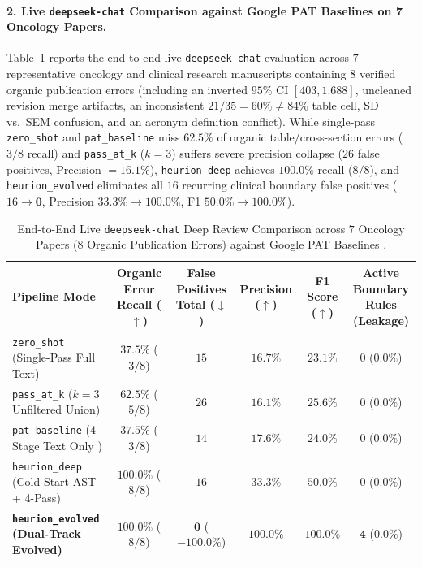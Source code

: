 \documentclass[11pt,a4paper]{article}
\makeatletter
\newcommand{\thead}[1]{\begin{tabular}[c]{@{}c@{}}#1\end{tabular}}
\makeatother
\begin{document}
\paragraph{2. Live \texttt{deepseek-chat} Comparison against Google PAT Baselines on 7 Oncology Papers.}
Table~\ref{tab:deep_review_7papers} reports the end-to-end live \texttt{deepseek-chat} evaluation across $7$ representative oncology and clinical research manuscripts containing $8$ verified organic publication errors (including an inverted $95\%$ CI $[403, 1.688]$, uncleaned revision merge artifacts, an inconsistent $21/35 = 60\% \neq 84\%$ table cell, SD vs.\ SEM confusion, and an acronym definition conflict). While single-pass \texttt{zero\_shot} and \texttt{pat\_baseline} \cite{googlepat2026} miss $62.5\%$ of organic table/cross-section errors ($3/8$ recall) and \texttt{pass\_at\_k} ($k=3$) suffers severe precision collapse ($26$ false positives, Precision $= 16.1\%$), \texttt{heurion\_deep} achieves $\mathbf{100.0\%}$ recall ($8/8$), and \texttt{heurion\_evolved} eliminates all $16$ recurring clinical boundary false positives ($16 \to \mathbf{0}$, Precision $33.3\% \to \mathbf{100.0\%}$, F1 $50.0\% \to \mathbf{100.0\%}$).

\begin{table}[!t]
\centering
\caption{End-to-End Live \texttt{deepseek-chat} Deep Review Comparison across $7$ Oncology Papers ($8$ Organic Publication Errors) against Google PAT Baselines \cite{googlepat2026}.}
\label{tab:deep_review_7papers}
\vspace{2pt}
\small
\setlength{\tabcolsep}{0pt}
\begin{tabular*}{\textwidth}{@{\extracolsep{\fill}}lccccc@{}}
\toprule
\textbf{Pipeline Mode} & \thead{\textbf{Organic Error}\\\textbf{Recall ($\uparrow$)}} & \thead{\textbf{False Positives}\\\textbf{Total ($\downarrow$)}} & \thead{\textbf{Precision}\\\textbf{($\uparrow$)}} & \thead{\textbf{F1 Score}\\\textbf{($\uparrow$)}} & \thead{\textbf{Active Boundary}\\\textbf{Rules (Leakage)}} \\
\midrule
\texttt{zero\_shot} (Single-Pass Full Text) & $37.5\%$ ($3/8$) & $15$ & $16.7\%$ & $23.1\%$ & $0$ ($0.0\%$) \\
\texttt{pass\_at\_k} ($k=3$ Unfiltered Union) & $62.5\%$ ($5/8$) & $26$ & $16.1\%$ & $25.6\%$ & $0$ ($0.0\%$) \\
\texttt{pat\_baseline} (4-Stage Text Only \cite{googlepat2026}) & $37.5\%$ ($3/8$) & $14$ & $17.6\%$ & $24.0\%$ & $0$ ($0.0\%$) \\
\texttt{heurion\_deep} (Cold-Start AST + 4-Pass) & $\mathbf{100.0\%}$ ($8/8$) & $16$ & $33.3\%$ & $50.0\%$ & $0$ ($0.0\%$) \\
\textbf{\texttt{heurion\_evolved} (Dual-Track Evolved)} & $\mathbf{100.0\%}$ ($8/8$) & $\mathbf{0}$ ($\mathbf{-100.0\%}$) & $\mathbf{100.0\%}$ & $\mathbf{100.0\%}$ & $\mathbf{4}$ ($\mathbf{0.0\%}$) \\
\bottomrule
\end{tabular*}
\end{table}
\end{document}
